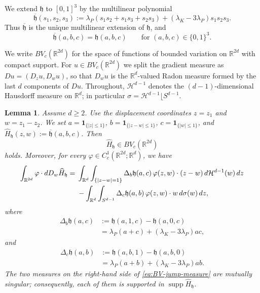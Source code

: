 \documentclass[11pt]{article}
\newtheorem{lemma}[theorem]{Lemma}
\theoremstyle{remark}
\newcommand{\R}{\mathbb R}
\newcommand{\ind}{\mathbf 1}
\numberwithin{equation}{section}
\begin{document}
We extend $\mathfrak h$ to $[0,1]^3$ by the multilinear polynomial
\[
\overline{\mathfrak h}(s_1,s_2,s_3)
:=
\lambda_P(s_1s_2+s_1s_3+s_2s_3)
+
(\lambda_K-3\lambda_P)s_1s_2s_3.
\]
Thus $\overline{\mathfrak h}$ is the unique multilinear extension of
$\mathfrak h$, and
\[
\overline{\mathfrak h}(a,b,c)
=
\mathfrak h(a,b,c)
\qquad
\text{for }(a,b,c)\in\{0,1\}^3.
\]

We write $BV_c(\R^{2d})$ for the space of functions of bounded variation
on $\R^{2d}$ with compact support.  For $u\in BV_c(\R^{2d})$ we split the
gradient measure as $Du=(D_zu,D_wu)$, so that $D_wu$ is the $\R^d$-valued
Radon measure formed by the last $d$ components of $Du$.  Throughout,
$\mathcal H^{d-1}$ denotes the $(d-1)$-dimensional Hausdorff measure on
$\R^d$; in particular $\sigma=\mathcal H^{d-1}\lfloor S^{d-1}$.

\begin{lemma}
\label{lem:BV-jump-formula}
Assume $d\ge2$.  Use the displacement coordinates
$z=z_1$ and
$w=z_1-z_2$.
We set
$a=\ind_{\{|z|\le1\}}$,
$b=\ind_{\{|z-w|\le1\}}$,
$c=\ind_{\{|w|\le1\}}$,
and
$\widehat H_{\mathfrak h}(z,w)
:=
\overline{\mathfrak h}(a,b,c)$.
Then
\[
\widehat H_{\mathfrak h}\in BV_c(\R^{2d})
\]
holds. 
Moreover, for every
$\varphi\in C_c^1(\R^{2d};\R^d)$, we have
\begin{align}
\int_{\R^{2d}}
\varphi\cdot dD_w\widehat H_{\mathfrak h}
={}&
\int_{\R^d}\int_{\{|z-w|=1\}}
\Delta_b\mathfrak h(a,c)\,
\varphi(z,w)\cdot(z-w)
\,d\mathcal H^{d-1}(w)\,dz
\label{eq:BV-jump-measure}\\
&-
\int_{\R^d}\int_{S^{d-1}}
\Delta_c\mathfrak h(a,b)\,
\varphi(z,w)\cdot w
\,d\sigma(w)\,dz,
\notag
\end{align}
where
\[
\begin{aligned}
\Delta_b\mathfrak h(a,c)
&:=
\mathfrak h(a,1,c)-\mathfrak h(a,0,c)\\
&=
\lambda_P(a+c)+(\lambda_K-3\lambda_P)ac,
\end{aligned}
\]
and
\[
\begin{aligned}
\Delta_c\mathfrak h(a,b)
&:=
\mathfrak h(a,b,1)-\mathfrak h(a,b,0)\\
&=
\lambda_P(a+b)+(\lambda_K-3\lambda_P)ab.
\end{aligned}
\]
The two measures on the right-hand side of \eqref{eq:BV-jump-measure}
are mutually singular; consequently, each of them is supported in
$\operatorname{supp}\widehat H_{\mathfrak h}$.
\end{lemma}
\end{document}
